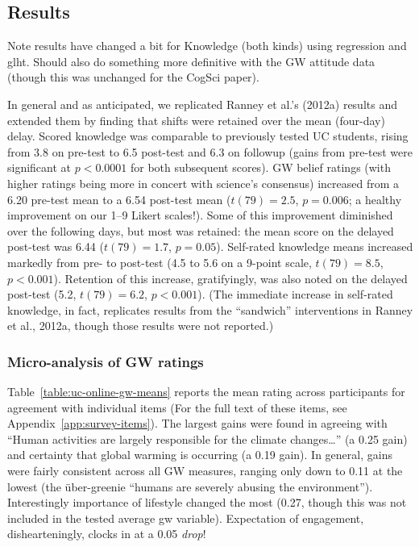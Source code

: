 \subsection{Results} 

Note results have changed a bit for Knowledge (both kinds) using
regression and glht. Should also do something more definitive with the GW
attitude data (though this was unchanged for the CogSci paper).

In general and as anticipated, we replicated Ranney et al.’s (2012a) results and
extended them by finding that shifts were retained over the mean (four-day)
delay. 
Scored knowledge was comparable to previously tested UC students, rising from
3.8 on pre-test to 6.5 post-test and 6.3 on followup (gains from pre-test were
significant at $p<0.0001$ for both subsequent scores). GW belief ratings (with
higher ratings being more in concert with science’s consensus) increased from a
6.20 pre-test mean to a 6.54 post-test mean ($t(79)=2.5$, $p=0.006$; a healthy
improvement on our 1--9 Likert scales!). Some of this improvement diminished over
the following days, but most was retained: the mean score on the delayed
post-test was 6.44 ($t(79)=1.7$, $p=0.05$). Self-rated knowledge means increased
markedly from pre- to post-test (4.5 to 5.6 on a 9-point scale, $t(79)=8.5$,
$p<0.001$). Retention of this increase, gratifyingly, was also noted on the
delayed post-test (5.2, $t(79)=6.2$, $p<0.001$). (The immediate increase in
self-rated knowledge, in fact, replicates results from the ``sandwich''
interventions in Ranney et al., 2012a, though those results were not reported.)

\subsubsection{Micro-analysis of GW ratings}

Table~\ref{table:uc-online-gw-means} reports the mean rating across participants
for agreement with individual items (For the full text of these items, see
Appendix~\ref{app:survey-items}). The largest gains were found in agreeing with
``Human activities are largely responsible for the climate changes\ldots'' (a
0.25 gain) and certainty that global warming is occurring (a 0.19 gain).  In
general, gains were fairly consistent across all GW measures, ranging only
down to 0.11 at the lowest (the über-greenie “humans are severely abusing the
environment”). Interestingly importance of lifestyle changed the most
(0.27, though this was not included in the tested average gw variable).
Expectation of engagement, dishearteningly, clocks in at a 0.05 \emph{drop}! 

